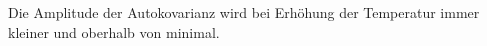 \documentclass[main.tex]{subfiles}
\begin{document}
Die Amplitude der Autokovarianz wird bei Erhöhung der Temperatur immer kleiner und oberhalb von  minimal.


\end{document}
